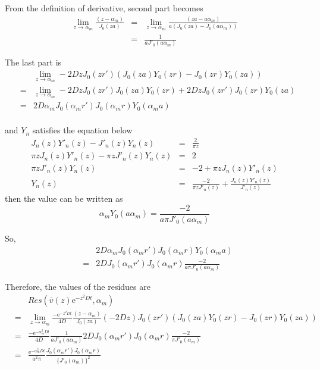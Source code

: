 \documentclass{article}
\begin{document}
From the definition of derivative, second part becomes
\begin{eqnarray}
        \lim_{z \to \alpha_m} \frac{(z - \alpha_m)}{J_0(za)}
    &=& \lim_{z \to \alpha_m} \frac{(za - a\alpha_m)}{a(J_0(za) - J_0(a\alpha_m))} \nonumber \\
    &=& \frac{1}{aJ'_0(a\alpha_m)}
\end{eqnarray}

The last part is 
\begin{eqnarray}
    & & \lim_{z \to \alpha_m} -2DzJ_0(zr')
        \left(J_0(za)Y_0(zr) - J_0(zr)Y_0(za) \right) \nonumber \\
    &=& \lim_{z \to \alpha_m} -2DzJ_0(zr')J_0(za)Y_0(zr) +
        2DzJ_0(zr')J_0(zr)Y_0(za) \nonumber \\
    &=& 2D\alpha_m J_0(\alpha_m r')J_0(\alpha_m r)Y_0(\alpha_m a) \nonumber \\
\end{eqnarray}

and $Y_n$ satisfies the equation below
\begin{eqnarray}
    J_n(z)Y'_n(z) - J'_n(z)Y_n(z) &=& \frac{2}{\pi z} \nonumber \\
    \pi zJ_n(z)Y'_n(z) - \pi zJ'_n(z)Y_n(z) &=& 2 \nonumber \\
    \pi zJ'_n(z)Y_n(z) &=& -2 + \pi zJ_n(z)Y'_n(z) \nonumber \\
    Y_n(z) &=& \frac{-2}{\pi zJ'_n(z)} + \frac{J_n(z)Y'_n(z)}{J'_n(z)}
\end{eqnarray}
then the value can be written as
\begin{equation}
    \alpha_mY_0(a\alpha_m) = \frac{-2}{a\pi J'_0(a\alpha_m)}
\end{equation}

So, 
\begin{eqnarray}
    & & 2D\alpha_mJ_0(\alpha_mr')J_0(\alpha_mr)Y_0(\alpha_ma) \nonumber \\
    &=& 2DJ_0(\alpha_mr')J_0(\alpha_mr)\frac{-2}{a\pi J'_0(a\alpha_m)}
\end{eqnarray}

Therefore, the values of the residues are
\begin{eqnarray}
    & & Res(\bar{v}(z)\mathrm{e}^{-z^2Dt}, \alpha_m) \nonumber \\
    &=& \lim_{z \to \alpha_m} \frac{-\mathrm{e}^{-z^2Dt}}{4D}
        \frac{(z - \alpha_m)}{J_0(za)}
        (-2Dz)J_0(zr')
        \left(J_0(za)Y_0(zr) - J_0(zr)Y_0(za) \right) \nonumber \\
    &=& \frac{-\mathrm{e}^{-\alpha_{m}^{2}Dt}}{4D}
        \frac{1}{aJ'_0(a\alpha_m)}
        2DJ_0(\alpha_mr')J_0(\alpha_mr)\frac{-2}{\pi J'_0(\alpha_m)} \nonumber \\
    &=& \frac{\mathrm{e}^{-\alpha_{m}^{2}Dt}}{a^2\pi}
        \frac{J_0(\alpha_mr')J_0(\alpha_mr)}{\{J'_0(\alpha_m)\}^2}
\end{eqnarray}
\end{document}
